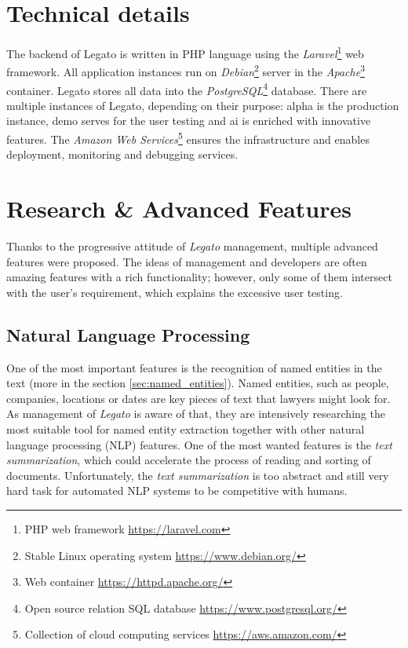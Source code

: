 \documentclass[
  digital, %
  notable,   %
  nolof,     %
  nolot,     %
]{fithesis3}
\begin{document}
\section{Technical details}
The backend of Legato is written in PHP language using the \textit{Laravel}\footnote{PHP web framework \url{https://laravel.com}} web framework.
All application instances run on \textit{Debian}\footnote{Stable Linux operating system \url{https://www.debian.org/}} server in the \textit{Apache}\footnote{Web container \url{https://httpd.apache.org/}} container.
Legato stores all data into the \textit{PostgreSQL}\footnote{Open source relation SQL database \url{https://www.postgresql.org/}} database.
There are multiple instances of Legato, depending on their purpose: alpha is the production instance, demo serves for the user testing and ai is enriched with innovative features.
The \textit{Amazon Web Services}\footnote{Collection of cloud computing services \url{https://aws.amazon.com/}} ensures the infrastructure and enables deployment, monitoring and debugging services.

\section{Research \& Advanced Features}
\label{sec:legato_advanced}
Thanks to the progressive attitude of \textit{Legato} management, multiple advanced features were proposed.
The ideas of management and developers are often amazing features with a rich functionality; however, only some of them intersect with the user's requirement, which explains the excessive user testing.

\subsection*{Natural Language Processing}
One of the most important features is the recognition of named entities in the text (more in the section \ref{sec:named_entities}).
Named entities, such as people, companies, locations or dates are key pieces of text that lawyers might look for.
As management of \textit{Legato} is aware of that, they are intensively researching the most suitable tool for named entity extraction together with other natural language processing (NLP) features.
One of the most wanted features is the \textit{text summarization}, which could accelerate the process of reading and sorting of documents.
Unfortunately, the \textit{text summarization} is too abstract and still very hard task for automated NLP systems to be competitive with humans.
\end{document}
